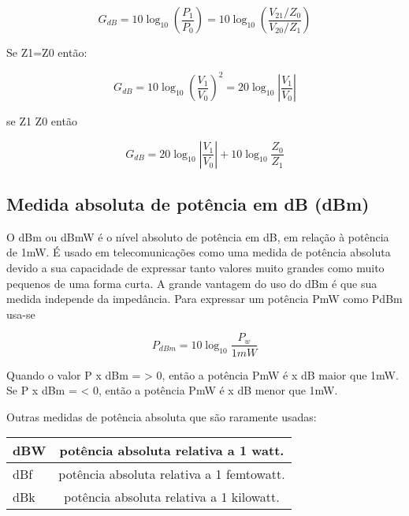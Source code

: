 \documentclass[
	article,			%
	11pt,				%
	oneside,			%
	a4paper,			%
	english,			%
	brazil,				%
	sumario=tradicional
	]{abntex2}
\begin{document}
    \begin{equation}
        {\displaystyle G_{dB}} =10\log_{10}(\frac{{\displaystyle P_{1}}}{{\displaystyle P_{0}}}) = 10\log_{10}(\frac{{\displaystyle V_{2 1}}/{\displaystyle Z_{0}}}{{\displaystyle V_{2 0}}/{\displaystyle Z_{1}}})
    \end{equation} 
    
    Se Z1=Z0 então:
    
    \begin{equation}
        {\displaystyle G_{dB}} =10\log_{10}(\frac{{\displaystyle V_{1}}}{{\displaystyle V_{0}}})^{2} = 20\log_{10}|\frac{{\displaystyle V_{1}}}{{\displaystyle V_{0}}}|
    \end{equation}
    
    se Z1 \neq Z0 então 
    
    \begin{equation}
        {\displaystyle G_{dB}} = 20\log_{10}|\frac{{\displaystyle V_{1}}}{{\displaystyle V_{0}}}|
        + 10\log_{10}\frac{{\displaystyle Z_{0}}}{{\displaystyle Z_{1}}}
    \end{equation}
    
\subsection{Medida absoluta de potência em dB
(dBm)}

        O dBm ou dBmW é o nível absoluto de potência em dB, em relação à
    potência de 1mW. É usado em telecomunicações como uma medida de
    potência absoluta devido a sua capacidade de expressar tanto valores
    muito grandes como muito pequenos de uma forma curta. A grande
    vantagem do uso do dBm é que sua medida independe da impedância.
    Para expressar um potência PmW como PdBm usa-se

    \begin{equation}
        {\displaystyle P_{dBm}} = 10\log_{10}\frac{{\displaystyle P_{w}}}{1mW}
    \end{equation}
    
    Quando o valor P x dBm = > 0, então a potência PmW é x dB maior que
1mW. Se P x dBm = < 0, então a potência PmW é x dB menor que 1mW.

Outras medidas de potência absoluta que são raramente usadas:


\begin{center}
    \begin{tabular}{|l|c|}
        \hline  
            dBW & potência absoluta relativa a 1 watt.\\ 
        \hline
            dBf & potência absoluta relativa a 1 femtowatt. \\
        \hline
            dBk & potência absoluta relativa a 1 kilowatt.\\ 
        \hline
        \end{tabular}
    \end{center}
\end{document}
